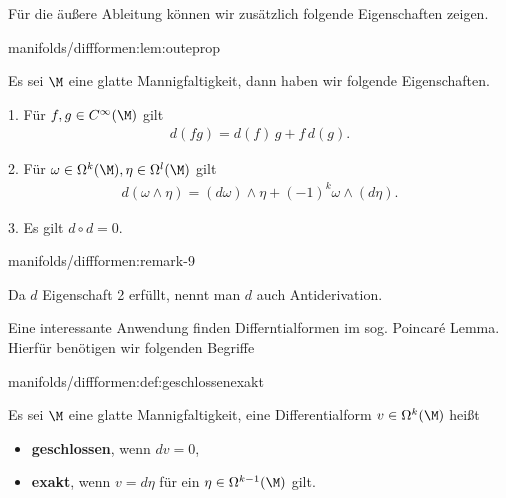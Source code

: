 \documentclass[letterpaper,10pt,german]{jupyterBook}
\begin{document}
\par
Für die äußere Ableitung können wir zusätzlich folgende Eigenschaften zeigen.
\begin{lemma}{}{manifolds/diffformen:lem:outeprop}



\par
Es sei \(\M\) eine glatte Mannigfaltigkeit, dann haben wir folgende Eigenschaften.



\par
1. Für \(f,g\in C^\infty(\M)\) gilt
\begin{align*}
d(fg) = d(f)\,g + f\, d(g).
\end{align*}


\par
2. Für \(\omega\in\Omega^k(\M),\eta\in\Omega^l(\M)\) gilt
\begin{align*}
d(\omega\wedge\eta) = (d\omega)\wedge \eta + (-1)^k \omega\wedge (d\eta).
\end{align*}


\par
3. Es gilt \(d\circ d = 0\).
\end{lemma}
\begin{remark}{}{manifolds/diffformen:remark-9}



\par
Da \(d\) Eigenschaft 2 erfüllt, nennt man \(d\) auch Antiderivation.
\end{remark}

\par
Eine interessante Anwendung finden Differntialformen im sog. Poincaré Lemma. Hierfür benötigen wir folgenden Begriffe
\begin{definition}{}{manifolds/diffformen:def:geschlossenexakt}



\par
Es sei \(\M\) eine glatte Mannigfaltigkeit, eine Differentialform \(v\in\Omega^k(\M)\) heißt
\begin{itemize}
\item {} 
\par
\textbf{geschlossen}, wenn \(dv=0\),

\item {} 
\par
\textbf{exakt}, wenn \(v=d\eta\) für ein \(\eta\in\Omega^{k-1}(\M)\) gilt.

\end{itemize}
\end{definition}
\end{document}
